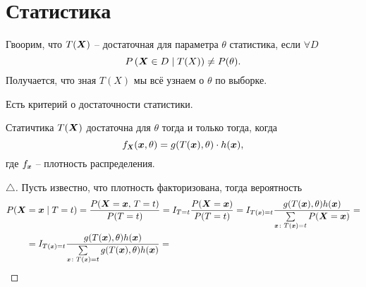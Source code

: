 


% 

\newpage

\section{Статистика}

Гвоорим, что $T(\mbox{\boldmath $X$})$ -- достаточная для параметра $\theta$ статистика, если $\forall  D$ 
\begin{equation*}
    P\left(\mbox{\boldmath $X$} \in D \mid T(X)\right) \neq P(\theta).
\end{equation*}
Получается, что зная $T(X)$ мы всё узнаем о $\theta$ по выборке. 

Есть критерий о достаточности статистики. 
\begin{to_thr}
    Статичтика $T(\mbox{\boldmath $X$})$ достаточна для $\theta$ тогда и только тогда, когда
    \begin{equation*}
        f_{\smallvc{X}} (\vc{x}, \theta) = g(T(\vc{x}), \theta) \cdot h(\vc{x}),
    \end{equation*}
    где $f_{\smallvc{x}}$ -- плотность распределения. 
\end{to_thr}

\begin{proof}[$\triangle$]
Пусть известно, что плотность факторизована, тогда вероятность
\begin{align*}
    P(\vc{X} &= \vc{x} \mid T = t) = \frac{P(\vc{X} = \vc{x},\, T=t)}{P(T=t)} = I_{T=t} \frac{P(\vc{X} = \vc{x})}{P(T=t)} = I_{T(\smallvc{x})=t} \frac{g(T(\vc{x}), \theta) h(\vc{x})}{\sum\limits_{\smallvc{x}\colon T(\smallvc{x})=t} P(\vc{X} = \vc{x})} 
    =  \\ &= 
    I_{T(\smallvc{x})=t} 
    \frac{g(T(\vc{x}), \theta) h(\vc{x})}{\sum\limits_{\smallvc{x}\colon T(\smallvc{x})=t} g(T(\vc{x}), \theta)h(\vc{x})} = 
\end{align*}
\end{proof}
